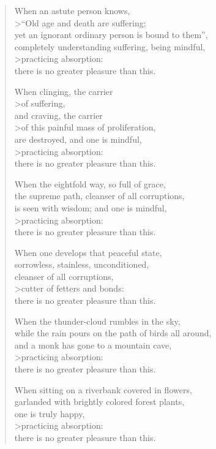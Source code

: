 \documentclass[12pt,openany]{book}%
\begin{document}
\begin{verse}%
When an astute person knows, \\>“Old age and death are suffering; \\
yet an ignorant ordinary person is bound to them”, \\
completely understanding suffering, being mindful, \\>practicing absorption: \\
there is no greater pleasure than this. 

When clinging, the carrier \\>of suffering, \\
and craving, the carrier  \\>of this painful mass of proliferation, \\
are destroyed, and one is mindful, \\>practicing absorption: \\
there is no greater pleasure than this. 

When the eightfold way, so full of grace, \\
the supreme path, cleanser of all corruptions, \\
is seen with wisdom; and one is mindful, \\>practicing absorption: \\
there is no greater pleasure than this. 

When one develops that peaceful state, \\
sorrowless, stainless, unconditioned, \\
cleanser of all corruptions, \\>cutter of fetters and bonds: \\
there is no greater pleasure than this. 

When the thunder-cloud rumbles in the sky, \\
while the rain pours on the path of birds all around, \\
and a monk has gone to a mountain cave, \\>practicing absorption: \\
there is no greater pleasure than this. 

When sitting on a riverbank covered in flowers, \\
garlanded with brightly colored forest plants, \\
one is truly happy, \\>practicing absorption: \\
there is no greater pleasure than this. 


\end{verse}
\end{document}
